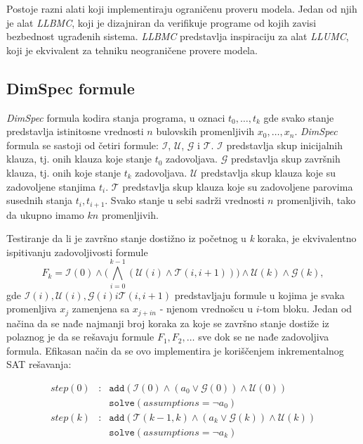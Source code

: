 \documentclass[a4paper]{article}
\theoremstyle{plain}
\theoremstyle{definition}
\begin{document}
Postoje razni alati koji implementiraju ograničenu proveru modela. Jedan od njih je alat \emph{LLBMC}, koji je dizajniran da verifikuje programe od kojih zavisi bezbednost ugrađenih sistema. \emph{LLBMC} predstavlja inspiraciju za alat \emph{LLUMC}, koji je ekvivalent za tehniku neograničene provere modela.

\subsection{DimSpec formule}
\label{subsec:DimSpec}

\emph{DimSpec} formula kodira stanja programa, u oznaci $t_{0}, \dots , t_{k}$ gde svako stanje predstavlja istinitosne vrednosti $n$ bulovskih promenljivih $x_{0}, \dots , x_{n}$. \emph{DimSpec} formula se sastoji od četiri formule: $\mathcal{I}$, $\mathcal{U}$, $\mathcal{G}$ i $\mathcal{T}$. $\mathcal{I}$ predstavlja skup inicijalnih klauza, tj. onih klauza koje stanje $t_{0}$ zadovoljava. $\mathcal{G}$ predstavlja skup završnih klauza, tj. onih koje stanje $t_{k}$ zadovoljava. $\mathcal{U}$ predstavlja skup klauza koje su zadovoljene stanjima $t_{i}$. $\mathcal{T}$ predstavlja skup klauza koje su zadovoljene parovima susednih stanja $t_{i}, t_{i+1}$. Svako stanje u sebi sadrži vrednosti $n$ promenljivih, tako da ukupno imamo $kn$ promenljivih.

Testiranje da li je završno stanje dostižno iz početnog u \emph{k} koraka, je ekvivalentno ispitivanju zadovoljivosti formule
    \begin{displaymath}
        F_{k} = \mathcal{I}(0) \wedge \bigg( \bigwedge_{i=0}^{k-1}{(\mathcal{U}(i) \wedge \mathcal{T}(i, i+1))} \bigg) \wedge \mathcal{U}(k) \wedge \mathcal{G}(k),
    \end{displaymath}
gde $\mathcal{I}(i), \mathcal{U}(i), \mathcal{G}(i) i \mathcal{T}(i, i+1)$ predstavljaju formule u kojima je svaka promenljiva $x_{j}$ zamenjena sa $x_{j + in}$ - njenom vrednošcu u $i$-tom bloku. Jedan od načina da se nađe najmanji broj koraka za koje se završno stanje dostiže iz polaznog je da se rešavaju formule $F_{1}, F_{2}, \dots$ sve dok se ne nađe zadovoljiva formula. Efikasan način da se ovo implementira je koriščenjem inkrementalnog SAT rešavanja:

    $$\begin{array}{rcl}
    step(0) & : & \texttt{add}(\mathcal{I}(0) \wedge (a_{0} \vee \mathcal{G}(0)) \wedge \mathcal{U}(0)) \\
        &   & \texttt{solve}(assumptions = \neg{a_{0}}) \\
    step(k) & : & \texttt{add}(\mathcal{T}(k - 1, k) \wedge (a_{k} \vee \mathcal{G}(k)) \wedge \mathcal{U}(k)) \\
        &   & \texttt{solve}(assumptions = \neg{a_{k}})
    \end{array}$$
\end{document}
